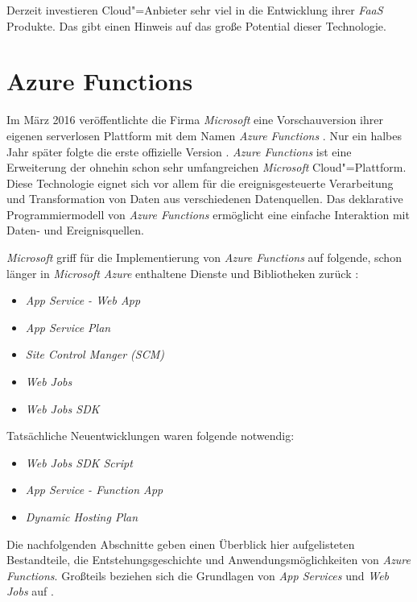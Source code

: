 Derzeit investieren Cloud"=Anbieter sehr viel in die Entwicklung ihrer \textit{FaaS} Produkte. Das gibt einen Hinweis auf das große Potential dieser Technologie.

\section{Azure Functions}

Im März 2016 veröffentlichte die Firma \textit{Microsoft} eine Vorschauversion ihrer eigenen serverlosen Plattform mit dem Namen \textit{Azure Functions} \cite{AzFunIntro}. Nur ein halbes Jahr später folgte die erste offizielle Version \cite{AzFunGA}. \textit{Azure Functions} ist eine Erweiterung der ohnehin schon sehr umfangreichen \textit{Microsoft} Cloud"=Plattform. Diese Technologie eignet sich vor allem für die ereignisgesteuerte Verarbeitung und Transformation von Daten aus verschiedenen Datenquellen. Das deklarative Programmiermodell von \textit{Azure Functions} ermöglicht eine einfache Interaktion mit Daten- und Ereignisquellen. 

\textit{Microsoft} griff für die Implementierung von \textit{Azure Functions} auf folgende, schon länger in \textit{Microsoft Azure} enthaltene Dienste und Bibliotheken zurück \cite{AzFunJourney}:

\begin{itemize}
	\item \textit{App Service - Web App}
	\item \textit{App Service Plan}
	\item \textit{Site Control Manger (SCM)}
	\item \textit{Web Jobs}
	\item \textit{Web Jobs SDK}
\end{itemize}

Tatsächliche Neuentwicklungen waren folgende notwendig:

\begin{itemize}
	\item \textit{Web Jobs SDK Script}
	\item \textit{App Service - Function App}
	\item \textit{Dynamic Hosting Plan}
\end{itemize}

Die nachfolgenden Abschnitte geben einen Überblick hier aufgelisteten Bestandteile, die Entstehungsgeschichte und Anwendungsmöglichkeiten von \textit{Azure Functions}. Großteils beziehen sich die Grundlagen von \textit{App Services} und \textit{Web Jobs} auf \cite{AzWebEssentials4Devs}.

